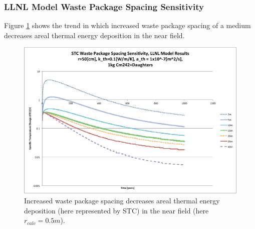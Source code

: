 

\begin{frame}[ctb!]
\frametitle{LLNL Model Waste Package Spacing Sensitivity}
\footnotesize{
Figure \ref{fig:Cm242spacing_sens} shows the trend in which increased waste package spacing of a medium decreases areal thermal energy 
deposition in the near field.

\begin{figure}[htbp!]
\begin{center}
\includegraphics[height=0.7\textheight]{./thermal_demonstration/spacing/Cm242spacing_sens.eps}
\end{center}
\caption[$K_{th}$ Sensitivity to $s$]{Increased waste package 
spacing decreases areal thermal energy deposition 
(here represented by STC) in the near field (here $r_{calc} = 0.5m$).}
\label{fig:Cm242spacing_sens}
\end{figure}
}
\end{frame}


